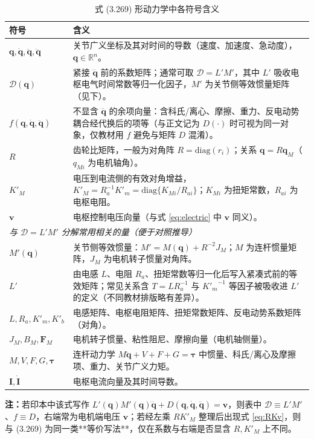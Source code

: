 \documentclass[UTF8,a4paper,12pt]{ctexart}
\begin{document}
\begin{table}[htbp]
\centering
\caption{式 (3.269) 形动力学中各符号含义}
\label{tab:eq-3269-params}
\begin{tabularx}{\textwidth}{l X}
\toprule
\textbf{符号} & \textbf{含义} \\
\midrule
$\bm{q},\dot{\bm{q}},\ddot{\bm{q}},\dddot{\bm{q}}$ &
关节广义坐标及其对时间的导数（速度、加速度、急动度），$\bm{q}\in\mathbb{R}^n$。 \\
$\mathcal{D}(\bm{q})$ &
紧接 $\dddot{\bm{q}}$ 前的系数矩阵；通常可取 $\mathcal{D}=L' M'$，其中 $L'$ 吸收电枢电气时间常数等归一化因子，$M'$ 为关节侧等效惯量矩阵（见下）。 \\
$f(\bm{q},\dot{\bm{q}},\ddot{\bm{q}})$ &
不显含 $\dddot{\bm{q}}$ 的余项向量：含科氏/离心、摩擦、重力、反电动势耦合经代换后的项等（与正文记为 $D(\cdot)$ 时可视为同一对象，仅教材用 $f$ 避免与矩阵 $D$ 混淆）。 \\
$R$ &
齿轮比矩阵，一般为对角阵 $R=\mathrm{diag}(r_i)$；关系 $\bm{q}=R\bm{q}_M$（$q_{Mi}$ 为电机轴角）。 \\
$K'_M$ &
电压到电流侧的有效对角增益，$K'_M=R_a^{-1}K'_m=\mathrm{diag}\{K_{Mi}/R_{ai}\}$；$K_{Mi}$ 为扭矩常数，$R_{ai}$ 为电枢电阻。 \\
$\bm{v}$ &
电枢控制电压向量（与式 \eqref{eq:electric} 中 $\bm{v}$ 同义）。 \\
\midrule
\multicolumn{2}{l}{\textit{与 $\mathcal{D}=L'M'$ 分解常用相关的量（便于对照推导）}} \\
\midrule
$M'(\bm{q})$ &
关节侧等效惯量：$M'=M(\bm{q})+R^{-2}J_M$；$M$ 为连杆惯量矩阵，$J_M$ 为电机转子惯量对角阵。 \\
$L'$ &
由电感 $L$、电阻 $R_a$、扭矩常数等归一化后写入紧凑式前的等效矩阵；常见关系含 $T=LR_a^{-1}$ 与 ${K'_m}^{-1}$ 等因子被吸收进 $L'$ 的定义（不同教材排版略有差异）。 \\
$L,R_a,K'_m,K'_b$ &
电感矩阵、电枢电阻矩阵、扭矩常数矩阵、反电动势系数矩阵（对角）。 \\
$J_M,B_M,\bm{F}_M$ &
电机转子惯量、粘性阻尼、摩擦向量（电机轴侧量）。 \\
$M,V,F,G,\bm{\tau}$ &
连杆动力学 $M\ddot{\bm{q}}+V+F+G=\bm{\tau}$ 中惯量、科氏/离心及摩擦项、重力、关节广义力矩。 \\
$\bm{I},\dot{\bm{I}}$ &
电枢电流向量及其时间导数。 \\
\bottomrule
\end{tabularx}
\end{table}

\noindent\textbf{注：}若印本中该式写作 $L'(\bm{q})M'(\bm{q})\dddot{\bm{q}}+D(\bm{q},\dot{\bm{q}},\ddot{\bm{q}})=\bm{v}$，则表中 $\mathcal{D}\equiv L'M'$、$f\equiv D$，右端常为电机端电压 $\bm{v}$；若经左乘 $RK'_M$ 整理后出现式 \eqref{eq:RKv}，则与 (3.269) 为同一类**等价写法**，仅在系数与右端是否显含 $R,K'_M$ 上不同。
\end{document}
